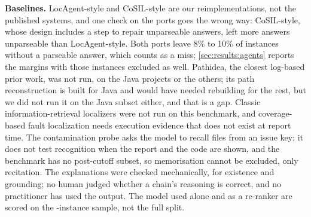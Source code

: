 \textbf{Baselines.} LocAgent-style and CoSIL-style are our
reimplementations, not the published systems, and one check on the
ports goes the wrong way: CoSIL-style, whose design includes a step to
repair unparseable answers, left more answers unparseable than
LocAgent-style. Both ports leave 8\% to 10\% of instances without a
parseable answer, which counts as a miss; \cref{sec:results:agents}
reports the margins with those instances excluded as well. Pathidea,
the closest log-based prior work, was not run, on the Java projects or
the others; its path reconstruction is built for Java and would have
needed rebuilding for the rest, but we did not run it on the Java
subset either, and that is a gap. Classic information-retrieval
localizers were not run on
this benchmark, and coverage-based fault localization needs execution
evidence that does not exist at report time. The contamination probe
asks the model to recall files from an issue key; it does not test
recognition when the report and the code are shown, and the benchmark
has no post-cutoff subset, so memorisation cannot be excluded, only
recitation. The explanations were checked mechanically, for existence
and grounding; no human judged whether a chain's reasoning is correct,
and no practitioner has used the output. The model used alone and as a
re-ranker are scored on the \nSample-instance sample, not the full
split.
